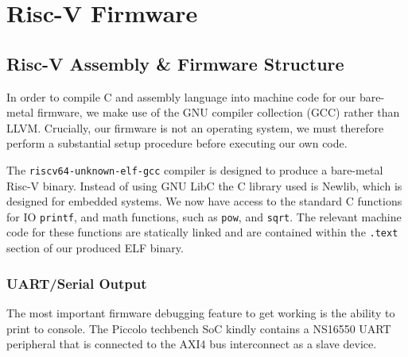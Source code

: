 \documentclass[a4paper,8pt]{report}
\begin{document}

\section{Risc-V Firmware}
\subsection{Risc-V Assembly \& Firmware Structure}
In order to compile C and assembly language into machine code for our bare-metal
firmware, we make use of the GNU compiler collection (GCC) rather than
LLVM\cite{riscv-gcc-vs-llvm}. Crucially, our firmware is not an operating
system, we must therefore perform a substantial setup procedure before executing
our own code.



The \texttt{riscv64-unknown-elf-gcc} compiler is designed to produce a
bare-metal Risc-V binary. Instead of using GNU LibC the C library used is
Newlib, which is designed for embedded systems. We now have access to the
standard C functions for IO \texttt{printf}, and math functions, such as
\texttt{pow}, and \texttt{sqrt}. The relevant machine code for these functions
are statically linked and are contained within the \texttt{.text} section of our
produced ELF binary.

\subsubsection{UART/Serial Output}
The most important firmware debugging feature to get working is the ability to
print to console. The Piccolo techbench SoC kindly contains a NS16550 UART
peripheral that is connected to the AXI4 bus interconnect as a slave device.  
\end{document}
